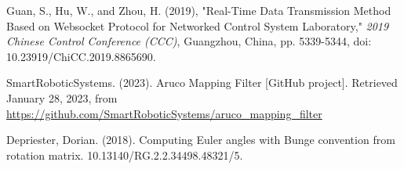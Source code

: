 \begin{flushleft}
\begin{thebibliography}{19}







Guan, S., Hu, W., and Zhou, H. (2019), "Real-Time Data Transmission Method Based on Websocket Protocol for Networked Control System Laboratory," \textit{2019 Chinese Control Conference (CCC)}, Guangzhou, China, pp. 5339-5344, doi: 10.23919/ChiCC.2019.8865690.












 SmartRoboticSystems. (2023). Aruco Mapping Filter [GitHub project]. Retrieved January 28, 2023, from \url{https://github.com/SmartRoboticSystems/aruco_mapping_filter}

Depriester, Dorian. (2018). Computing Euler angles with Bunge convention from rotation matrix. 10.13140/RG.2.2.34498.48321/5.


\end{thebibliography}

\end{flushleft}
